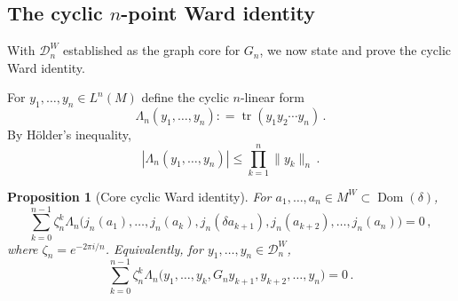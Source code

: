 \documentclass[11pt,a4paper]{article}
\theoremstyle{plain}
\numberwithin{theorem}{section}
\newtheorem{proposition}[theorem]{Proposition}
\theoremstyle{definition}
\newcommand{\?}{\overset{?}{=}}
\newcommand{\defeq}{\mathrel{\mathop:}=}
\DeclareMathOperator{\tr}{tr}
\newcommand{\cD}{\mathcal{D}}
\DeclareMathOperator{\Dom}{Dom}
\begin{document}
\subsection{The cyclic \texorpdfstring{$n$}{n}-point Ward identity}
\label{subsec:cyclic-ward-identity-fixed}

With $\cD_n^W$ established as the graph core for $G_n$, we now state and prove the cyclic Ward identity.

For $y_1,\ldots,y_n\in L^n(M)$ define the cyclic $n$-linear form
\begin{equation}
  \Lambda_n(y_1,\ldots,y_n)\defeq \tr(y_1y_2\cdots y_n)\,.
\end{equation}
By H\"older's inequality,
\begin{equation}
  |\Lambda_n(y_1,\ldots,y_n)|\leq \prod_{k=1}^n\|y_k\|_n\,.
\end{equation}

\begin{proposition}[Core cyclic Ward identity]
\label{prop:core-cyclic-ward-fixed}
For $a_1,\ldots,a_n\in M^W \subset \Dom(\delta)$,
\begin{equation}\label{eq:ward-on-core-An}
    \sum_{k=0}^{n-1}\zeta_n^k
  \Lambda_n\bigl(
    j_n(a_1),\ldots,j_n(a_k),j_n(\delta a_{k+1}),j_n(a_{k+2}),\ldots,j_n(a_n)
  \bigr)=0\,,
\end{equation}
where $\zeta_n =e^{-2\pi i/n}$.
Equivalently, for $y_1,\ldots,y_n\in\cD_n^{W}$,
\begin{equation}\label{eq:ward-on-core-Dn}
    \sum_{k=0}^{n-1}\zeta_n^k
  \Lambda_n\bigl(
    y_1,\ldots,y_k,G_ny_{k+1},y_{k+2},\ldots,y_n
  \bigr)=0\,.
\end{equation}
\end{proposition}
\end{document}
